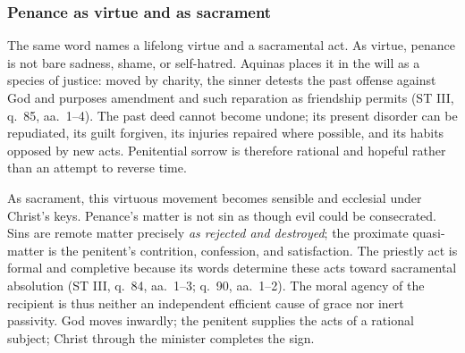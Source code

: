 \subsubsection{Penance as virtue and as sacrament}

The same word names a lifelong virtue and a sacramental act. As virtue, penance is not bare sadness, shame, or self-hatred. Aquinas places it in the will as a species of justice: moved by charity, the sinner detests the past offense against God and purposes amendment and such reparation as friendship permits (ST III, q.~85, aa.~1--4). The past deed cannot become undone; its present disorder can be repudiated, its guilt forgiven, its injuries repaired where possible, and its habits opposed by new acts. Penitential sorrow is therefore rational and hopeful rather than an attempt to reverse time.

As sacrament, this virtuous movement becomes sensible and ecclesial under Christ's keys. Penance's matter is not sin as though evil could be consecrated. Sins are remote matter precisely \emph{as rejected and destroyed}; the proximate quasi-matter is the penitent's contrition, confession, and satisfaction. The priestly act is formal and completive because its words determine these acts toward sacramental absolution (ST III, q.~84, aa.~1--3; q.~90, aa.~1--2). The moral agency of the recipient is thus neither an independent efficient cause of grace nor inert passivity. God moves inwardly; the penitent supplies the acts of a rational subject; Christ through the minister completes the sign.

